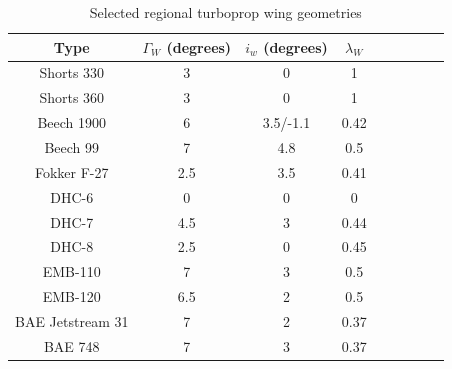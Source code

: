 \documentclass[conf]{new-aiaa}
\begin{document}
\begin{table}[H]
\centering
\caption{Selected regional turboprop wing geometries}
\label{tab:SelectedWingGeometry}
    \begin{tabular}{|c|c|c|c|c|c|c|c|c|} \hline
        Type             & $\Gamma_W$ (degrees) & $i_w$ (degrees) & $\lambda_W$ \\ \hline
        Shorts 330       & 3   & 0        & 1    \\ \hline
        Shorts 360       & 3   & 0        & 1    \\ \hline
        Beech 1900       & 6   & 3.5/-1.1 & 0.42 \\ \hline
        Beech 99         & 7   & 4.8      & 0.5  \\ \hline
        Fokker F-27      & 2.5 & 3.5      & 0.41 \\ \hline
        DHC-6            & 0   & 0        & 0    \\ \hline
        DHC-7            & 4.5 & 3        & 0.44 \\ \hline
        DHC-8            & 2.5 & 0        & 0.45 \\ \hline
        EMB-110          & 7   & 3        & 0.5  \\ \hline
        EMB-120          & 6.5 & 2        & 0.5  \\ \hline
        BAE Jetstream 31 & 7   & 2        & 0.37 \\ \hline
        BAE 748          & 7   & 3        & 0.37 \\ \hline
    \end{tabular}
\end{table}
\end{document}
